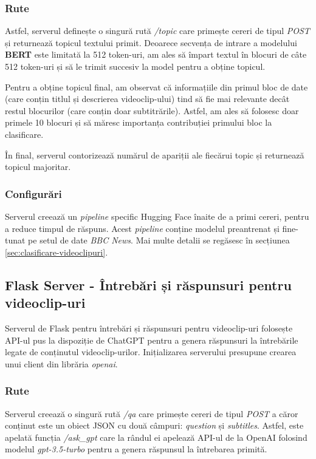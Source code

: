 \subsubsection{Rute}
\par
Astfel, serverul definește o singură rută \textit{/topic} care primește cereri de tipul \textit{POST}
și returnează topicul textului primit. Deoarece secvența de intrare a modelului \textbf{BERT} este 
limitată la 512 token-uri, am ales să împart textul în blocuri de câte 512 token-uri și să le trimit
succesiv la model pentru a obține topicul.
\par
Pentru a obține topicul final, am observat că informațiile din primul bloc de date (care conțin titlul 
și descrierea videoclip-ului) tind să fie mai relevante decât restul blocurilor (care conțin doar subtitrările).
Astfel, am ales să folosesc doar primele 10 blocuri și să măresc importanța contribuției primului bloc
la clasificare.
\par
În final, serverul contorizează numărul de apariții ale fiecărui topic și returnează topicul majoritar.
\subsubsection{Configurări}
\par
Serverul creează un \textit{pipeline} specific Hugging Face înaite de a primi cereri, pentru a reduce
timpul de răspuns. Acest \textit{pipeline} conține modelul preantrenat și fine-tunat pe setul de date
\textit{BBC News}. Mai multe detalii se regăsesc în secțiunea \ref{sec:clasificare-videoclipuri}.

\subsection{Flask Server - Întrebări și răspunsuri pentru videoclip-uri}
Serverul de Flask pentru întrebări și răspunsuri pentru videoclip-uri folosește API-ul pus
la dispoziție de ChatGPT pentru a genera răspunsuri la întrebările legate de conținutul
videoclip-urilor. Inițializarea serverului presupune crearea unui client din librăria 
\textit{openai}.
\subsubsection{Rute}
\par
Serverul creează o singură rută \textit{/qa} care primește cereri de tipul \textit{POST}
a căror conținut este un obiect JSON cu două câmpuri: \textit{question} și \textit{subtitles}.
Astfel, este apelată funcția \textit{/ask\_gpt} care la rândul ei apelează API-ul de la OpenAI
folosind modelul \textit{gpt-3.5-turbo} pentru a genera răspunsul la întrebarea primită.




